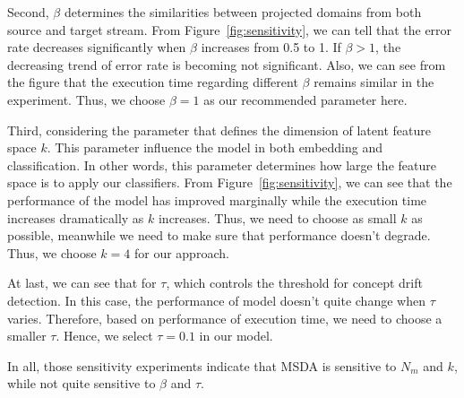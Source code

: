 Second, $\beta$ determines the similarities between projected domains from both source and target stream. From Figure~\ref{fig:sensitivity}, we can tell that the error rate decreases significantly when $\beta$ increases from 0.5 to 1. If $\beta > 1$, the decreasing trend of error rate is becoming not significant. Also, we can see from the figure that the execution time regarding different $\beta$ remains similar in the experiment. Thus, we choose $\beta = 1$ as our recommended parameter here.

Third, considering the parameter that defines the dimension of latent feature space $k$. This parameter influence the model in both embedding and classification. In other words, this parameter determines how large the feature space is to apply our classifiers. From Figure~\ref{fig:sensitivity}, we can see that the performance of the model has improved marginally while the execution time increases dramatically as $k$ increases. Thus, we need to choose as small $k$ as possible, meanwhile we need to make sure that performance doesn't degrade. Thus, we choose $k = 4$ for our approach.

At last, we can see that for $\tau$, which controls the threshold for concept drift detection. In this case, the performance of model doesn't quite change when $\tau$ varies. Therefore, based on performance of execution time, we need to choose a smaller $\tau$. Hence, we select $\tau = 0.1$ in our model.

In all, those sensitivity experiments indicate that MSDA is sensitive to $N_m$ and $k$, while not quite sensitive to $\beta$ and $\tau$. 